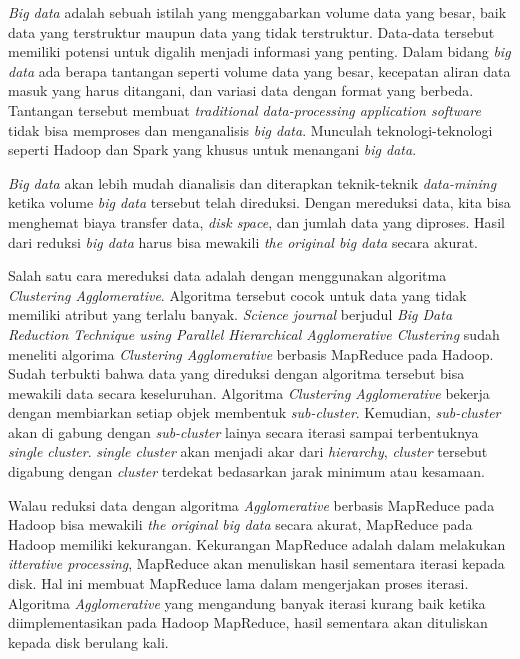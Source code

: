 \documentclass[a4paper,twoside]{article}
\begin{document}
{\it Big data} adalah sebuah istilah yang menggabarkan volume data yang besar, baik data yang terstruktur maupun data yang tidak terstruktur. Data-data tersebut memiliki potensi untuk digalih menjadi informasi yang penting. Dalam bidang {\it big data} ada  berapa tantangan seperti volume data yang besar, kecepatan aliran data masuk yang harus ditangani, dan variasi data dengan format yang berbeda. Tantangan tersebut membuat {\it traditional data-processing application software} tidak bisa memproses dan menganalisis {\it big data}. Munculah teknologi-teknologi seperti Hadoop dan Spark yang khusus untuk menangani {\it big data}. 

{\it Big data} akan lebih mudah dianalisis dan diterapkan teknik-teknik {\it data-mining} ketika volume {\it big data} tersebut telah direduksi. Dengan mereduksi data, kita bisa menghemat biaya transfer data, {\it disk space}, dan jumlah data yang diproses. Hasil dari reduksi {\it big data} harus bisa mewakili {\it the original big data} secara akurat. 

Salah satu cara mereduksi data adalah dengan menggunakan algoritma {\it Clustering Agglomerative}. Algoritma tersebut cocok untuk data yang tidak memiliki atribut yang terlalu banyak. {\it Science journal} berjudul {\it Big Data Reduction Technique using Parallel Hierarchical Agglomerative Clustering} sudah meneliti algorima {\it Clustering Agglomerative} berbasis MapReduce pada Hadoop. Sudah terbukti bahwa data yang direduksi dengan algoritma tersebut bisa mewakili data secara keseluruhan. Algoritma {\it Clustering Agglomerative} bekerja dengan membiarkan setiap objek membentuk {\it sub-cluster}. Kemudian, {\it sub-cluster} akan di gabung dengan {\it sub-cluster} lainya secara iterasi sampai terbentuknya {\it single cluster}. {\it single cluster} akan menjadi akar dari {\it hierarchy}, {\it cluster} tersebut digabung dengan {\it cluster} terdekat bedasarkan jarak minimum atau kesamaan.

Walau reduksi data dengan algoritma {\it Agglomerative} berbasis MapReduce pada Hadoop bisa mewakili {\it the original big data} secara akurat, MapReduce pada Hadoop memiliki kekurangan. Kekurangan MapReduce adalah dalam melakukan {\it itterative processing}, MapReduce akan menuliskan hasil sementara iterasi kepada disk. Hal ini membuat MapReduce lama dalam mengerjakan proses iterasi. Algoritma {\it Agglomerative} yang mengandung banyak iterasi kurang baik ketika diimplementasikan pada Hadoop MapReduce, hasil sementara akan dituliskan kepada disk berulang kali.
\end{document}
